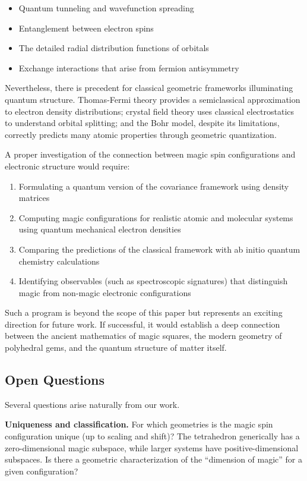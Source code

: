 \begin{itemize}
\item Quantum tunneling and wavefunction spreading
\item Entanglement between electron spins
\item The detailed radial distribution functions of orbitals
\item Exchange interactions that arise from fermion antisymmetry
\end{itemize}

Nevertheless, there is precedent for classical geometric frameworks illuminating quantum structure. Thomas-Fermi theory provides a semiclassical approximation to electron density distributions; crystal field theory uses classical electrostatics to understand orbital splitting; and the Bohr model, despite its limitations, correctly predicts many atomic properties through geometric quantization.

A proper investigation of the connection between magic spin configurations and electronic structure would require:

\begin{enumerate}
\item Formulating a quantum version of the covariance framework using density matrices
\item Computing magic configurations for realistic atomic and molecular systems using quantum mechanical electron densities
\item Comparing the predictions of the classical framework with ab initio quantum chemistry calculations
\item Identifying observables (such as spectroscopic signatures) that distinguish magic from non-magic electronic configurations
\end{enumerate}

Such a program is beyond the scope of this paper but represents an exciting direction for future work. If successful, it would establish a deep connection between the ancient mathematics of magic squares, the modern geometry of polyhedral gems, and the quantum structure of matter itself.

\subsection{Open Questions}

Several questions arise naturally from our work.

\textbf{Uniqueness and classification.} For which geometries is the magic spin configuration unique (up to scaling and shift)? The tetrahedron generically has a zero-dimensional magic subspace, while larger systems have positive-dimensional subspaces. Is there a geometric characterization of the ``dimension of magic'' for a given configuration?

